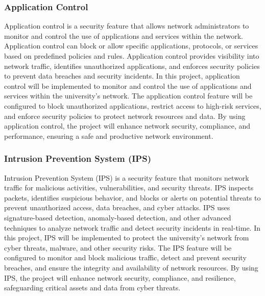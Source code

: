 \documentclass[12pt]{report}
\begin{document}
\subsubsection{Application Control}
Application control is a security feature that allows network administrators to monitor and control the use of applications and services within the network. Application control can block or allow specific applications, protocols, or services based on predefined policies and rules. Application control provides visibility into network traffic, identifies unauthorized applications, and enforces security policies to prevent data breaches and security incidents. In this project, application control will be implemented to monitor and control the use of applications and services within the university's network. The application control feature will be configured to block unauthorized applications, restrict access to high-risk services, and enforce security policies to protect network resources and data. By using application control, the project will enhance network security, compliance, and performance, ensuring a safe and productive network environment. %
\subsubsection{Intrusion Prevention System (IPS)}
Intrusion Prevention System (IPS) is a security feature that monitors network traffic for malicious activities, vulnerabilities, and security threats. IPS inspects packets, identifies suspicious behavior, and blocks or alerts on potential threats to prevent unauthorized access, data breaches, and cyber attacks. IPS uses signature-based detection, anomaly-based detection, and other advanced techniques to analyze network traffic and detect security incidents in real-time. In this project, IPS will be implemented to protect the university's network from cyber threats, malware, and other security risks. The IPS feature will be configured to monitor and block malicious traffic, detect and prevent security breaches, and ensure the integrity and availability of network resources. By using IPS, the project will enhance network security, compliance, and resilience, safeguarding critical assets and data from cyber threats. %
\end{document}
